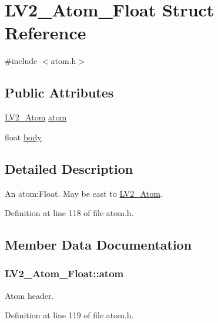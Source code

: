 \hypertarget{struct_l_v2___atom___float}{}\section{L\+V2\+\_\+\+Atom\+\_\+\+Float Struct Reference}
\label{struct_l_v2___atom___float}


{\ttfamily \#include $<$atom.\+h$>$}

\subsection*{Public Attributes}
\begin{DoxyCompactItemize}
\item 
\hyperlink{struct_l_v2___atom}{L\+V2\+\_\+\+Atom} \hyperlink{struct_l_v2___atom___float_abf54a176efbfb5bf29d0e427f0698c7c}{atom}
\item 
float \hyperlink{struct_l_v2___atom___float_a7a13def55ea33c5d18883815c9809441}{body}
\end{DoxyCompactItemize}


\subsection{Detailed Description}
An atom\+:Float. May be cast to \hyperlink{struct_l_v2___atom}{L\+V2\+\_\+\+Atom}. 

Definition at line 118 of file atom.\+h.



\subsection{Member Data Documentation}
\subsubsection[{\texorpdfstring{atom}{atom}}]{ L\+V2\+\_\+\+Atom\+\_\+\+Float\+::atom}\hypertarget{struct_l_v2___atom___float_abf54a176efbfb5bf29d0e427f0698c7c}{}\label{struct_l_v2___atom___float_abf54a176efbfb5bf29d0e427f0698c7c}
Atom header. 

Definition at line 119 of file atom.\+h.

